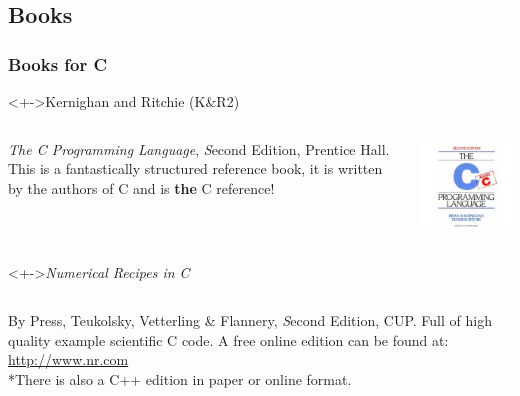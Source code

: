 \documentclass[smaller,handout,table]{beamer}
\begin{document}
\subsection{Books}
\begin{frame}
\frametitle{Books for C}
\begin{block}<+->{Kernighan and Ritchie (K\&R2)}
\begin{columns}
\begin{column}{8cm}
\emph{The C Programming Language}, {\emph Second Edition},
Prentice Hall. This is a fantastically structured reference book, it is written by the authors of C and is \textbf{the} C reference!
\end{column}
\begin{column}{1.5cm}
\includegraphics[width=\textwidth]{kandr.png}
\end{column}
\end{columns}
\end{block}

\begin{block}<+->{\emph{Numerical Recipes in C}}
\begin{columns}
\begin{column}{8cm}
By Press, Teukolsky, Vetterling \& Flannery, {\emph Second Edition}, CUP.
Full of high quality example scientific C code. A free online edition can be found at:
\url{http://www.nr.com}\\*There is also a C++ edition in paper or online format.
\end{column}
\end{columns}
\end{block}
\end{frame}
\end{document}
